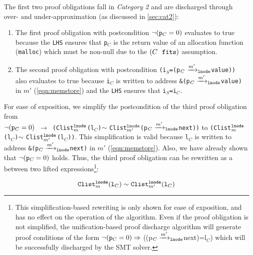 The first two proof obligations fall in {\em Category 2} and
are discharged through over- and under-approximation (as discussed
in \cref{sec:cat2}):
\begin{enumerate}
\item The first proof obligation with
postcondition $\neg({\tt p}_C=0)$
evaluates to true because the {\tt LHS} ensures that {\tt p$_C$} is the
return value of an allocation function ({\tt malloc}) which must be
non-null due to the $(C\ \  \mathrm{\tt fits})$ assumption.
\item The second proof obligation with
postcondition {\tt (i$_S$=(p$_C\xrightarrow[]{m'}_{\mathrm{\tt lnode}}$value))}
also evaluates to true because {\tt i$_C$} is written to address {\tt \&(p$_C\xrightarrow[]{m'}_{\mathrm{\tt lnode}}$value)}
in $m'$ (\cref{eqn:memstore}) and the {\tt LHS} ensures that {\tt i$_S$=i$_C$}.
\end{enumerate}

For ease of exposition, we simplify the postcondition of the third proof obligation
from \\
{\small \tt $\neg({\tt p}_C=0)$ $\rightarrow$ (Clist$_{m}^{{\tt lnode}}$(l$_C$)$\sim{}$Clist$_{m'}^{{\tt lnode}}$(p$_C\xrightarrow[]{m'}_{\mathrm{\tt lnode}}$next))}
to
{\tt (Clist$_{m}^{{\tt lnode}}$(l$_C$)$\sim{}$Clist$_{m'}^{{\tt lnode}}$(l$_C$))}.
This simplification is valid because {\tt l$_C$}
is written
to address {\tt \&(p$_C\xrightarrow[]{m'}_{\mathrm{\tt lnode}}$next)}
in $m'$ (\cref{eqn:memstore}).
Also, we have already
shown that $\neg({\tt p}_C=0)$ holds.
Thus, the third proof obligation can be rewritten as
a \recursiveRelation{} between two lifted expressions\footnote{This
simplification-based rewriting is only
shown for ease of exposition,
and has no effect on the operation
of the algorithm.
Even if the proof obligation is not simplified,
the unification-based proof discharge algorithm will generate
proof conditions of the form $\neg({\tt p}_C=0)\Rightarrow{}$((p$_C\xrightarrow[]{m'}_{\mathrm{\tt lnode}}$next)=l$_C$)
which will be successfully discharged by the SMT solver.}:
\begin{small}
\begin{equation}\label{eqn:clistPreserved}
{\tt Clist}_m^{\tt lnode}({\tt l}_C) \sim{} {\tt Clist}_{m'}^{\tt lnode}({{\tt l}_C})
\end{equation}
\end{small}

